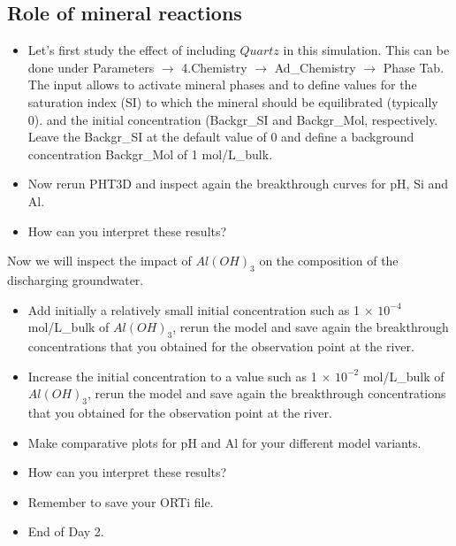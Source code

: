 \subsection[Role of mineral reactions]{Role of mineral reactions}

\begin{itemize}

\item Let's first study the effect of including $Quartz$ in this simulation. 
This can be done under 
{\color{blue}Parameters} $\rightarrow$ 
{\color{blue}4.Chemistry} $\rightarrow$ 
{\color{blue}Ad\_Chemistry} $\rightarrow$ 
{\color{blue}Phase} Tab. 
The input allows to activate mineral phases 
and to define values for the saturation index (SI) to which the mineral should be equilibrated (typically 0).
and the initial concentration {\color{blue}(Backgr\_SI} and {\color{blue}Backgr\_Mol}, respectively.
Leave the {\color{blue}Backgr\_SI} at the default value of 0 and define a background 
concentration {\color{blue}Backgr\_Mol} of 1 mol/L\_bulk. 

\item Now rerun PHT3D and inspect again the breakthrough curves for pH, Si and Al.

\item How can you interpret these results?  

\end{itemize}

Now we will inspect the impact of $Al(OH)_3$ on the composition of the discharging groundwater.

\begin{itemize}

\item Add initially a relatively small initial concentration such as 1 $\times$ $10^{-4}$ mol/L\_bulk 
of $Al(OH)_3$, rerun the model and save again the breakthrough concentrations that you obtained for the observation point at the river.

\item Increase the initial concentration to a value such as 1 $\times$ $10^{-2}$ mol/L\_bulk 
of $Al(OH)_3$, rerun the model and save again the breakthrough concentrations that you obtained for the observation point at the river.

\item Make comparative plots for pH and Al for your different model variants. 

\item How can you interpret these results?

\item Remember to save your ORTi file.

\item End of Day 2.


\end{itemize}

